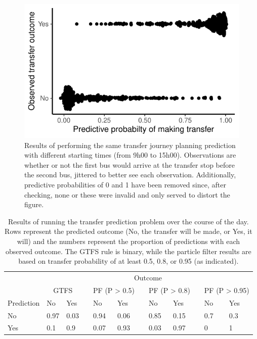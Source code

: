 \begin{knitrout}\small
{}\color{fgcolor}\begin{figure}

{\centering \includegraphics[width=.5\textwidth]{figure/eta_journey_transfer_many-1} 

}

\caption[Results of performing the same transfer journey planning prediction with different starting times (from  9h00 to 15h00)]{Results of performing the same transfer journey planning prediction with different starting times (from  9h00 to 15h00). Observations are whether or not the first bus would arrive at the transfer stop before the second bus, jittered to better see each observation. Additionally, predictive probabilities of 0 and 1 have been removed since, after checking, none or these were invalid and only served to distort the figure.}\label{fig:eta_journey_transfer_many}
\end{figure}

\begin{table}

\caption{\label{tab:eta_journey_transfer_many}Results of running the transfer prediction problem over the course of the day. Rows represent the predicted outcome (No, the transfer will be made, or Yes, it will) and the numbers represent the proportion of predictions with each observed outcome. The GTFS rule is binary, while the particle filter results are based on transfer probability of at least 0.5, 0.8, or 0.95 (as indicated).}
\centering
\fontsize{8}{10}\selectfont
\begin{tabular}[t]{llllllllllll}
\toprule
\multicolumn{1}{c}{} & \multicolumn{11}{c}{Outcome} \\
\cmidrule(l{3pt}r{3pt}){2-12}
\multicolumn{1}{c}{} & \multicolumn{2}{c}{GTFS} & \multicolumn{1}{c}{} & \multicolumn{2}{c}{PF (P > 0.5)} & \multicolumn{1}{c}{} & \multicolumn{2}{c}{PF (P > 0.8)} & \multicolumn{1}{c}{} & \multicolumn{2}{c}{PF (P > 0.95)} \\
\cmidrule(l{3pt}r{3pt}){2-3} \cmidrule(l{3pt}r{3pt}){5-6} \cmidrule(l{3pt}r{3pt}){8-9} \cmidrule(l{3pt}r{3pt}){11-12}
Prediction & No & Yes &  & No & Yes &  & No & Yes &  & No & Yes\\
\midrule
No & 0.97 & 0.03 &  & 0.94 & 0.06 &  & 0.85 & 0.15 &  & 0.7 & 0.3\\
Yes & 0.1 & 0.9 &  & 0.07 & 0.93 &  & 0.03 & 0.97 &  & 0 & 1\\
\bottomrule
\end{tabular}
\end{table}


\end{knitrout}



